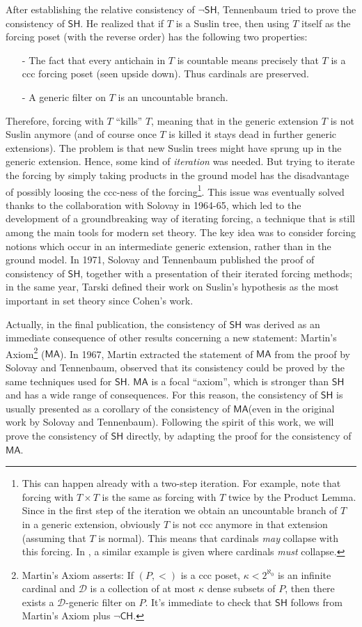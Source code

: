 \documentclass[11pt,a4paper]{report}
\theoremstyle{definition}
\theoremstyle{num.custom-title}
\theoremstyle{custom-title}
\newcommand{\CH}{\ensuremath{\mathsf{CH}}\xspace}
\newcommand{\SH}{\ensuremath{\mathsf{SH}}\xspace}
\newcommand{\nSH}{\ensuremath{\neg\mathsf{SH}}\xspace}
\newcommand{\MA}{\ensuremath{\mathsf{MA}}\xspace}
\begin{document}
After establishing the relative consistency of $\nSH$, Tennenbaum tried to prove the consistency of $\SH$. He realized that if $T$ is a Suslin tree, then using $T$ itself as the forcing poset (with the reverse order) has the following two properties:
\begin{itemize}
\item[-] The fact that every antichain in $T$ is countable means precisely that $T$ is a ccc forcing poset (seen upside down). Thus cardinals are preserved.
\item[-] A generic filter on $T$ is an uncountable branch.
\end{itemize}
Therefore, forcing with $T$ ``kills'' $T$, meaning that in the generic extension $T$ is not Suslin anymore (and of course once $T$ is killed it stays dead in further generic extensions). The problem is that new Suslin trees might have sprung up in the generic extension. Hence, some kind of \emph{iteration} was needed. But trying to iterate the forcing by simply taking products in the ground model has the disadvantage of possibly loosing the ccc-ness of the forcing\footnote{This can happen already with a two-step iteration. For example, note that forcing with $T \times T$ is the same as forcing with $T$ twice by the Product Lemma. Since in the first step of the iteration we obtain an uncountable branch of $T$ in a generic extension, obviously $T$ is not ccc anymore in that extension (assuming that $T$ is normal). This means that cardinals \emph{may} collapse with this forcing. In \cite[p.\ 38]{Dev1974}, a similar example is given where cardinals \emph{must} collapse.}. This issue was eventually solved thanks to the collaboration with Solovay in 1964-65, which led to the development of a groundbreaking way of iterating forcing, a technique that is still among the main tools for modern set theory. The key idea was to consider forcing notions which occur in an intermediate generic extension, rather than in the ground model. In 1971, Solovay and Tennenbaum published \cite{Sol1971} the proof of consistency of \SH, together with a presentation of their iterated forcing methods; in the same year, Tarski defined their work on Suslin's hypothesis as the most important in set theory since Cohen's work.

Actually, in the final publication, the consistency of \SH was derived as an immediate consequence of other results concerning a new statement: Martin's Axiom\footnote{Martin's Axiom asserts: If $(P,<)$ is a ccc poset, $\kappa < 2^{\aleph_0}$ is an infinite cardinal and $\mathcal D$ is a collection of at most $\kappa$ dense subsets of $P$, then there exists a $\mathcal D$-generic filter on $P$. It's immediate to check that \SH follows from Martin's Axiom plus $\neg \CH$.} (\MA). In 1967, Martin extracted the statement of \MA from the proof by Solovay and Tennenbaum, observed that its consistency could be proved by the same techniques used for \SH. \MA is a focal ``axiom'', which is stronger than \SH and has a wide range of consequences. For this reason, the consistency of \SH is usually presented as a corollary of the consistency of \MA (even in the original work by Solovay and Tennenbaum). Following the spirit of this work, we will prove the consistency of \SH directly, by adapting the proof for the consistency of \MA.
\end{document}
